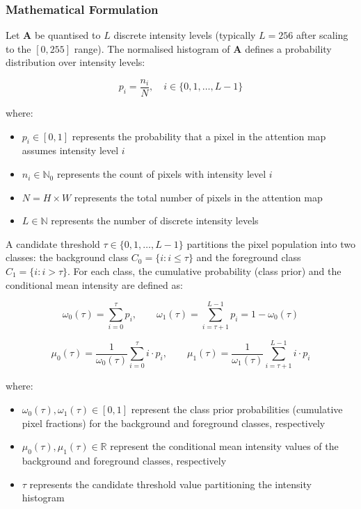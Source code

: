 \subsubsection{Mathematical Formulation}

Let $\mathbf{A}$ be quantised to $L$ discrete intensity levels (typically $L = 256$ after scaling to the $[0, 255]$ range). The normalised histogram of $\mathbf{A}$ defines a probability distribution over intensity levels:

\begin{equation}
p_i = \frac{n_i}{N}, \quad i \in \{0, 1, \ldots, L-1\}
\end{equation}

where:
\begin{itemize}
\item $p_i \in [0,1]$ represents the probability that a pixel in the attention map assumes intensity level $i$
\item $n_i \in \mathbb{N}_0$ represents the count of pixels with intensity level $i$
\item $N = H \times W$ represents the total number of pixels in the attention map
\item $L \in \mathbb{N}$ represents the number of discrete intensity levels
\end{itemize}

A candidate threshold $\tau \in \{0, 1, \ldots, L-1\}$ partitions the pixel population into two classes: the background class $C_0 = \{i : i \leq \tau\}$ and the foreground class $C_1 = \{i : i > \tau\}$. For each class, the cumulative probability (class prior) and the conditional mean intensity are defined as:

\begin{equation}
\omega_0(\tau) = \sum_{i=0}^{\tau} p_i, \qquad \omega_1(\tau) = \sum_{i=\tau+1}^{L-1} p_i = 1 - \omega_0(\tau)
\end{equation}

\begin{equation}
\mu_0(\tau) = \frac{1}{\omega_0(\tau)} \sum_{i=0}^{\tau} i \cdot p_i, \qquad \mu_1(\tau) = \frac{1}{\omega_1(\tau)} \sum_{i=\tau+1}^{L-1} i \cdot p_i
\end{equation}

where:
\begin{itemize}
\item $\omega_0(\tau), \omega_1(\tau) \in [0,1]$ represent the class prior probabilities (cumulative pixel fractions) for the background and foreground classes, respectively
\item $\mu_0(\tau), \mu_1(\tau) \in \mathbb{R}$ represent the conditional mean intensity values of the background and foreground classes, respectively
\item $\tau$ represents the candidate threshold value partitioning the intensity histogram
\end{itemize}

